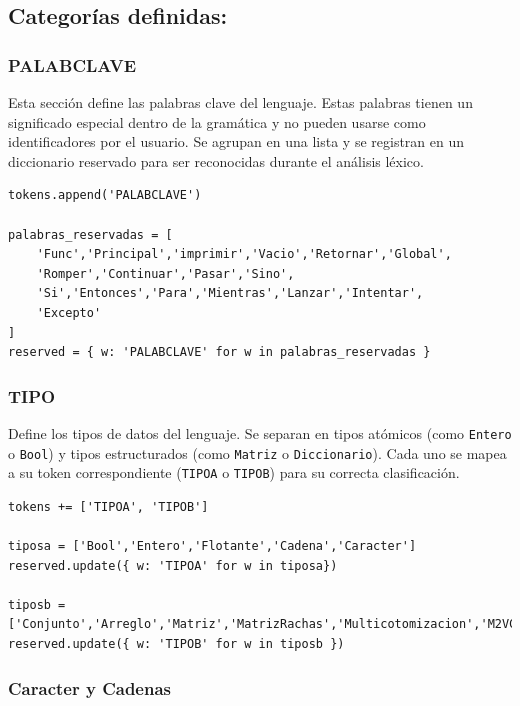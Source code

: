 \documentclass{article}
\begin{document}
\subsection{Categorías definidas:}

\subsubsection{PALABCLAVE}

Esta sección define las palabras clave del lenguaje. Estas palabras tienen un significado especial dentro de la gramática y no pueden usarse como identificadores por el usuario. Se agrupan en una lista y se registran en un diccionario reservado para ser reconocidas durante el análisis léxico.

\begin{lstlisting}[style=mypython]
tokens.append('PALABCLAVE')

palabras_reservadas = [
    'Func','Principal','imprimir','Vacio','Retornar','Global',
    'Romper','Continuar','Pasar','Sino',
    'Si','Entonces','Para','Mientras','Lanzar','Intentar',
    'Excepto'
]
reserved = { w: 'PALABCLAVE' for w in palabras_reservadas }
\end{lstlisting}

\subsubsection{TIPO}

Define los tipos de datos del lenguaje. Se separan en tipos atómicos (como \texttt{Entero} o \texttt{Bool}) y tipos estructurados (como \texttt{Matriz} o \texttt{Diccionario}). Cada uno se mapea a su token correspondiente (\texttt{TIPOA} o \texttt{TIPOB}) para su correcta clasificación.

\begin{lstlisting}[style=mypython]
tokens += ['TIPOA', 'TIPOB']

tiposa = ['Bool','Entero','Flotante','Cadena','Caracter']
reserved.update({ w: 'TIPOA' for w in tiposa})

tiposb = ['Conjunto','Arreglo','Matriz','MatrizRachas','Multicotomizacion','M2VClasificacion','Diccionario']
reserved.update({ w: 'TIPOB' for w in tiposb })
\end{lstlisting}

\subsubsection{Caracter y Cadenas}
\end{document}
